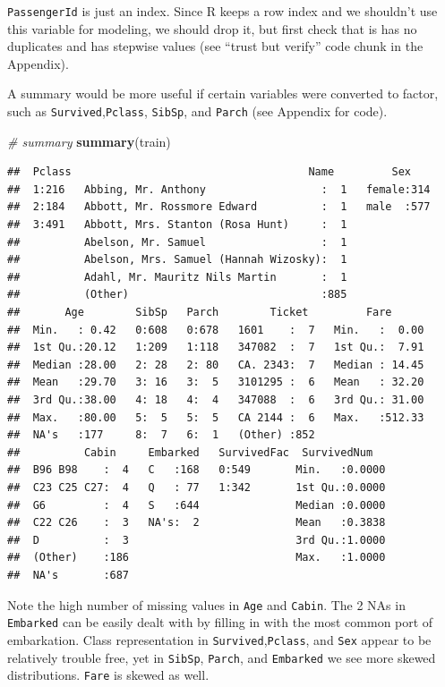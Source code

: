 \documentclass[]{article}
\newenvironment{Shaded}{\begin{snugshade}}{\end{snugshade}}
\newcommand{\KeywordTok}[1]{\textcolor[rgb]{0.13,0.29,0.53}{\textbf{#1}}}
\newcommand{\CommentTok}[1]{\textcolor[rgb]{0.56,0.35,0.01}{\textit{#1}}}
\newcommand{\NormalTok}[1]{#1}
\begin{document}
\texttt{PassengerId} is just an index. Since R keeps a row index and we
shouldn't use this variable for modeling, we should drop it, but first
check that is has no duplicates and has stepwise values (see ``trust but
verify'' code chunk in the Appendix).

A summary would be more useful if certain variables were converted to
factor, such as \texttt{Survived},\texttt{Pclass}, \texttt{SibSp}, and
\texttt{Parch} (see Appendix for code).

\begin{Shaded}
\begin{Highlighting}[]
\CommentTok{# summary}
\KeywordTok{summary}\NormalTok{(train)}
\end{Highlighting}
\end{Shaded}

\begin{verbatim}
##  Pclass                                     Name         Sex     
##  1:216   Abbing, Mr. Anthony                  :  1   female:314  
##  2:184   Abbott, Mr. Rossmore Edward          :  1   male  :577  
##  3:491   Abbott, Mrs. Stanton (Rosa Hunt)     :  1               
##          Abelson, Mr. Samuel                  :  1               
##          Abelson, Mrs. Samuel (Hannah Wizosky):  1               
##          Adahl, Mr. Mauritz Nils Martin       :  1               
##          (Other)                              :885               
##       Age        SibSp   Parch        Ticket         Fare       
##  Min.   : 0.42   0:608   0:678   1601    :  7   Min.   :  0.00  
##  1st Qu.:20.12   1:209   1:118   347082  :  7   1st Qu.:  7.91  
##  Median :28.00   2: 28   2: 80   CA. 2343:  7   Median : 14.45  
##  Mean   :29.70   3: 16   3:  5   3101295 :  6   Mean   : 32.20  
##  3rd Qu.:38.00   4: 18   4:  4   347088  :  6   3rd Qu.: 31.00  
##  Max.   :80.00   5:  5   5:  5   CA 2144 :  6   Max.   :512.33  
##  NA's   :177     8:  7   6:  1   (Other) :852                   
##          Cabin     Embarked   SurvivedFac  SurvivedNum    
##  B96 B98    :  4   C   :168   0:549       Min.   :0.0000  
##  C23 C25 C27:  4   Q   : 77   1:342       1st Qu.:0.0000  
##  G6         :  4   S   :644               Median :0.0000  
##  C22 C26    :  3   NA's:  2               Mean   :0.3838  
##  D          :  3                          3rd Qu.:1.0000  
##  (Other)    :186                          Max.   :1.0000  
##  NA's       :687
\end{verbatim}

Note the high number of missing values in \texttt{Age} and
\texttt{Cabin}. The 2 NAs in \texttt{Embarked} can be easily dealt with
by filling in with the most common port of embarkation. Class
representation in \texttt{Survived},\texttt{Pclass}, and \texttt{Sex}
appear to be relatively trouble free, yet in \texttt{SibSp},
\texttt{Parch}, and \texttt{Embarked} we see more skewed distributions.
\texttt{Fare} is skewed as well.
\end{document}
